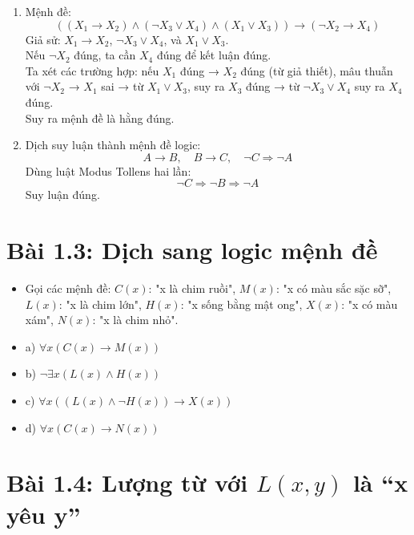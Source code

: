 \documentclass[12pt]{article}
\begin{document}
\begin{enumerate}
    \item Mệnh đề:
    \[ ((X_1 \rightarrow X_2) \land (\neg X_3 \lor X_4) \land (X_1 \lor X_3)) \rightarrow (\neg X_2 \rightarrow X_4) \]
    Giả sử: $X_1 \rightarrow X_2$, $\neg X_3 \lor X_4$, và $X_1 \lor X_3$.\\
    Nếu $\neg X_2$ đúng, ta cần $X_4$ đúng để kết luận đúng.\\
    Ta xét các trường hợp: nếu $X_1$ đúng → $X_2$ đúng (từ giả thiết), mâu thuẫn với $\neg X_2$ → $X_1$ sai → từ $X_1 \lor X_3$, suy ra $X_3$ đúng → từ $\neg X_3 \lor X_4$ suy ra $X_4$ đúng.\\
    Suy ra mệnh đề là hằng đúng.

    \item Dịch suy luận thành mệnh đề logic:
    \[ A \rightarrow B, \quad B \rightarrow C, \quad \neg C \Rightarrow \neg A \]
    Dùng luật Modus Tollens hai lần:
    \[ \neg C \Rightarrow \neg B \Rightarrow \neg A \]
    Suy luận đúng.
\end{enumerate}

\section*{Bài 1.3: Dịch sang logic mệnh đề}

\begin{itemize}
    \item Gọi các mệnh đề: $C(x)$: "x là chim ruồi", $M(x)$: "x có màu sắc sặc sỡ", $L(x)$: "x là chim lớn", $H(x)$: "x sống bằng mật ong", $X(x)$: "x có màu xám", $N(x)$: "x là chim nhỏ".

    \item a) $\forall x (C(x) \rightarrow M(x))$

    \item b) $\neg \exists x (L(x) \land H(x))$

    \item c) $\forall x ((L(x) \land \neg H(x)) \rightarrow X(x))$

    \item d) $\forall x (C(x) \rightarrow N(x))$
\end{itemize}

\section*{Bài 1.4: Lượng từ với $L(x,y)$ là “x yêu y”}
\end{document}
